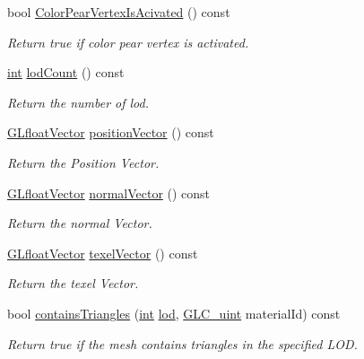 \begin{DoxyCompactItemize}
bool \hyperlink{class_g_l_c___mesh_a2bf2709d67b255a5cd347cd7de08c77d}{Color\-Pear\-Vertex\-Is\-Acivated} () const 
\begin{DoxyCompactList}\small\item\em Return true if color pear vertex is activated. \end{DoxyCompactList}\item 
\hyperlink{ioapi_8h_a787fa3cf048117ba7123753c1e74fcd6}{int} \hyperlink{class_g_l_c___mesh_aca3c0295b3b7d72b85f6ef502ba83650}{lod\-Count} () const 
\begin{DoxyCompactList}\small\item\em Return the number of lod. \end{DoxyCompactList}\item 
\hyperlink{glc__global_8h_a9f3f0b00cd127b066c9931b9c257a046}{G\-Lfloat\-Vector} \hyperlink{class_g_l_c___mesh_a2dd8774ea2e27d6501c94aa4a4b66428}{position\-Vector} () const 
\begin{DoxyCompactList}\small\item\em Return the Position Vector. \end{DoxyCompactList}\item 
\hyperlink{glc__global_8h_a9f3f0b00cd127b066c9931b9c257a046}{G\-Lfloat\-Vector} \hyperlink{class_g_l_c___mesh_ae5c7672bccc198eea2f4a5aea7a3c592}{normal\-Vector} () const 
\begin{DoxyCompactList}\small\item\em Return the normal Vector. \end{DoxyCompactList}\item 
\hyperlink{glc__global_8h_a9f3f0b00cd127b066c9931b9c257a046}{G\-Lfloat\-Vector} \hyperlink{class_g_l_c___mesh_af8622449f747c8de7038aa5cc01d9fb2}{texel\-Vector} () const 
\begin{DoxyCompactList}\small\item\em Return the texel Vector. \end{DoxyCompactList}\item 
bool \hyperlink{class_g_l_c___mesh_afe05c540730d4acb9d21f6d27d534fdc}{contains\-Triangles} (\hyperlink{ioapi_8h_a787fa3cf048117ba7123753c1e74fcd6}{int} \hyperlink{glext_8h_a5b5a34b88a28ab9c203c2b432f6168b6}{lod}, \hyperlink{glc__global_8h_abf950976fabed69026558df8e2da6c6b}{G\-L\-C\-\_\-uint} material\-Id) const 
\begin{DoxyCompactList}\small\item\em Return true if the mesh contains triangles in the specified L\-O\-D. \end{DoxyCompactList}\item 

\end{DoxyCompactItemize}
